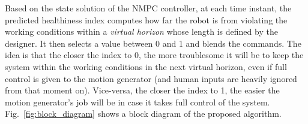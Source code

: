 Based on the state solution of the NMPC controller, at each time instant, the predicted healthiness index computes how far the robot is from violating the working conditions within a \emph{virtual horizon} whose length is defined by the designer. It then selects a value between 0 and 1 and blends the commands. The idea is that the closer the index to 0, the more troublesome it will be to keep the system within the working conditions in the next virtual horizon, even if full control is given to the motion generator (and human inputs are heavily ignored from that moment on). Vice-versa, the closer the index to 1, the easier the motion generator's job will be in case it takes full control of the system.  Fig.~\ref{fig:block_diagram} shows a block diagram of the proposed algorithm.